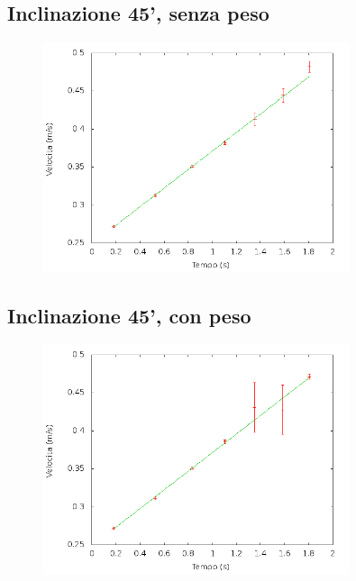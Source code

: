 \documentclass[12pt]{article} %
\begin{document}
	\subsection {Inclinazione 45', senza peso}
	\begin{figure}[H]
		\centering
		\includegraphics[width=0.8\textwidth]{velocita_45gradi_normale}
		\label{fig:45n}
	\end{figure}
 
	\subsection {Inclinazione 45', con peso}
		\begin{figure}[H]
		\centering
		\includegraphics[width=0.8\textwidth]{velocita_45gradi_peso}
		\label{fig:45p}
	\end{figure}
 
\end{document}
